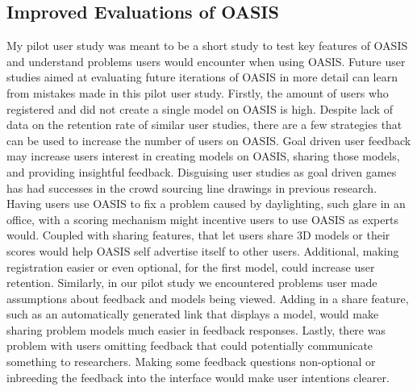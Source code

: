 \subsection{Improved Evaluations of OASIS}
My pilot user study was meant to be a short study to test key features of OASIS and understand problems users would encounter when using OASIS.
Future user studies aimed at evaluating future iterations of OASIS in more detail can learn from mistakes made in this pilot user study.
Firstly, the amount of users who registered and did not create a single model on OASIS is high.
Despite lack of data on the retention rate of similar user studies, there are a few strategies that can be used to increase the number of users on OASIS.
Goal driven user feedback may increase users interest in creating models on OASIS, sharing those models, and providing insightful feedback. 
Disguising user studies as goal driven games has had successes in the crowd sourcing line drawings in previous research\cite{}.
Having users use OASIS to fix a problem caused by daylighting, such glare in an office, with a scoring mechanism might incentive users to use OASIS as experts would. 
Coupled with sharing features, that let users share 3D models or their scores would help OASIS self advertise itself to other users.
Additional, making registration easier or even optional, for the first model, could increase user retention.
Similarly, in our pilot study we encountered problems user made assumptions about feedback and models being viewed.
Adding in a share feature, such as an automatically generated link that displays a model, would make sharing problem models much easier in feedback responses.
Lastly, there was problem with users omitting feedback that could potentially communicate something to researchers.
Making some feedback questions non-optional or inbreeding the feedback into the interface would make user intentions clearer.

